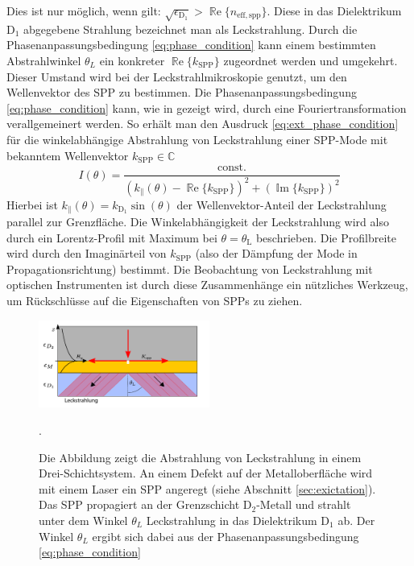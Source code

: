 \documentclass[titlepage,  ngerman]{article}
\renewcommand{\Re}{\operatorname{\mathbb{R}e}}
\renewcommand{\Im}{\operatorname{\mathbb{I}m}}
\begin{document}
	Dies ist nur möglich, wenn gilt: {$\sqrt{\epsilon_{\mathrm{D}_1}} > \Re\{n_\mathrm{eff, spp}\}$}. Diese in das Dielektrikum $\mathrm{D}_1$ abgegebene Strahlung bezeichnet man als Leckstrahlung. Durch die Phasenanpassungsbedingung \eqref{eq:phase_condition} kann einem bestimmten Abstrahlwinkel $\theta_L$ ein konkreter $\Re\{k_{\mathrm{SPP}}\}$ zugeordnet werden und umgekehrt. Dieser Umstand wird bei der Leckstrahlmikroskopie genutzt, um den Wellenvektor des SPP zu bestimmen.
	Die Phasenanpassungsbedingung \eqref{eq:phase_condition} kann, wie in \cite{Burke.1986} gezeigt wird, durch eine Fouriertransformation verallgemeinert werden. So erhält man den Ausdruck \eqref{eq:ext_phase_condition} für die winkelabhängige Abstrahlung von Leckstrahlung einer SPP-Mode mit bekanntem Wellenvektor $k_{\mathrm{SPP}} \in \mathbb{C}$
	\begin{equation}
		\label{eq:ext_phase_condition}
		I(\theta) = \dfrac{\text{const.}}{\left(k_{\parallel}(\theta) - \Re\{k_{\mathrm{SPP}}\}\right)^2 + (\Im\{k_{\mathrm{SPP}}\})^2}
	\end{equation}
	Hierbei ist $k_{\parallel}(\theta) = k_{\mathrm{D}_1}\sin(\theta)$ der Wellenvektor-Anteil der Leckstrahlung parallel zur Grenzfläche. Die Winkelabhängigkeit der Leckstrahlung wird also durch ein Lorentz-Profil mit Maximum bei $\theta = \theta_\mathrm{L}$ beschrieben. Die Profilbreite wird durch den Imaginärteil von $k_{\mathrm{SPP}}$ (also der Dämpfung der Mode in Propagationsrichtung) bestimmt. Die Beobachtung von Leckstrahlung mit optischen Instrumenten ist durch diese Zusammenhänge ein nützliches Werkzeug, um Rückschlüsse auf die Eigenschaften von SPPs zu ziehen.
	\begin{figure}[h] 
		\centering
		\includegraphics[width=0.5\textwidth]{figures/leckstrahlung.pdf}
		\caption[Leckstrahlung Drei-Schichtsystem]{Die Abbildung zeigt die Abstrahlung von Leckstrahlung in einem Drei-Schichtsystem. An einem Defekt auf der Metalloberfläche wird mit einem Laser ein SPP angeregt (siehe Abschnitt \ref{sec:exictation}). Das SPP propagiert an der Grenzschicht $\mathrm{D}_2$-Metall und strahlt unter dem Winkel $\theta_L$ Leckstrahlung in das Dielektrikum $\mathrm{D}_1$ ab. Der Winkel $\theta_L$ ergibt sich dabei aus der Phasenanpassungsbedingung \eqref{eq:phase_condition}}.
		\label{fig:leakage_radiation}
	\end{figure}
\end{document}
